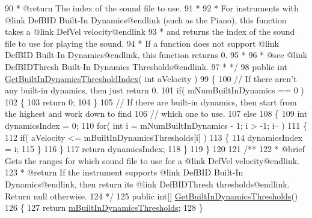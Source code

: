 \begin{DoxyCodeInclude}
90 \textcolor{comment}{     * @return The index of the sound file to use.}
91 \textcolor{comment}{     * }
92 \textcolor{comment}{     * For instruments with @link DefBID Built-In Dynamics@endlink (such as the Piano), this function takes
       a @link DefVel velocity@endlink}
93 \textcolor{comment}{     * and returns the index of the sound file to use for playing the sound. }
94 \textcolor{comment}{     * If a function does not support @link DefBID Built-In Dynamics@endlink, this function returns 0.}
95 \textcolor{comment}{     * }
96 \textcolor{comment}{     * @see @link DefBIDThresh Built-In Dynamics Thresholds@endlink.}
97 \textcolor{comment}{     *  */}
98     \textcolor{keyword}{public} \textcolor{keywordtype}{int} \hyperlink{group___v_i_base_pub_func_gacddf07c08c3a8154a6934be22f539788}{GetBuiltInDynamicsThresholdIndex}( \textcolor{keywordtype}{int} aVelocity )
99     \{
100         \textcolor{comment}{// If there aren't any built-in dynamics, then just return 0.}
101         \textcolor{keywordflow}{if}( mNumBuiltInDynamics == 0 )
102         \{
103             \textcolor{keywordflow}{return} 0;
104         \}
105         \textcolor{comment}{// If there are built-in dynamics, then start from the highest and work down to find}
106         \textcolor{comment}{// which one to use. }
107         \textcolor{keywordflow}{else}
108         \{
109             \textcolor{keywordtype}{int} dynamicsIndex = 0;
110             \textcolor{keywordflow}{for}( \textcolor{keywordtype}{int} i = mNumBuiltInDynamics - 1; i > -1; i-- )
111             \{
112                 \textcolor{keywordflow}{if}( aVelocity <= mBuiltInDynamicsThresholds[i] )
113                 \{
114                     dynamicsIndex = i;
115                 \}
116             \}
117             \textcolor{keywordflow}{return} dynamicsIndex;
118         \}
119     \}
120 \textcolor{comment}{}
121 \textcolor{comment}{    /**}
122 \textcolor{comment}{     * @brief Gets the ranges for which sound file to use for a @link DefVel velocity@endlink. }
123 \textcolor{comment}{     * @return If the instrument supports @link DefBID Built-In Dynamics@endlink, then return its @link
       DefBIDThresh thresholds@endlink. Return null otherwise.}
124 \textcolor{comment}{     */}
125     \textcolor{keyword}{public} \textcolor{keywordtype}{int}[] \hyperlink{group___v_i_base_pub_func_gac8fc20c49c1b97b6787ed1b3e0073a7f}{GetBuiltInDynamicsThresholds}()
126     \{
127         \textcolor{keywordflow}{return} \hyperlink{group___v_i_base_pro_var_gae3db4264dc2a96e99ea680c6d637e6bf}{mBuiltInDynamicsThresholds};
128     \}

\end{DoxyCodeInclude}
